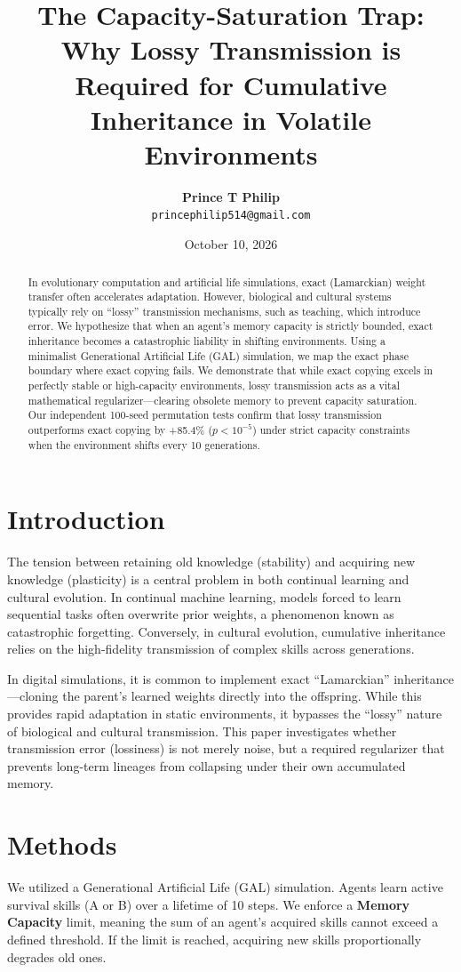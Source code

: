 \documentclass[11pt,a4paper]{article}
\title{\textbf{The Capacity-Saturation Trap: Why Lossy Transmission is Required for Cumulative Inheritance in Volatile Environments}}
\author{\textbf{Prince T Philip} \\ \texttt{princephilip514@gmail.com}}
\date{October 10, 2026}
\begin{document}
\maketitle

\begin{abstract}
In evolutionary computation and artificial life simulations, exact (Lamarckian) weight transfer often accelerates adaptation. However, biological and cultural systems typically rely on ``lossy'' transmission mechanisms, such as teaching, which introduce error. We hypothesize that when an agent's memory capacity is strictly bounded, exact inheritance becomes a catastrophic liability in shifting environments. Using a minimalist Generational Artificial Life (GAL) simulation, we map the exact phase boundary where exact copying fails. We demonstrate that while exact copying excels in perfectly stable or high-capacity environments, lossy transmission acts as a vital mathematical regularizer---clearing obsolete memory to prevent capacity saturation. Our independent 100-seed permutation tests confirm that lossy transmission outperforms exact copying by +85.4\% ($p < 10^{-5}$) under strict capacity constraints when the environment shifts every 10 generations.
\end{abstract}

\section{Introduction}
The tension between retaining old knowledge (stability) and acquiring new knowledge (plasticity) is a central problem in both continual learning and cultural evolution. In continual machine learning, models forced to learn sequential tasks often overwrite prior weights, a phenomenon known as catastrophic forgetting. Conversely, in cultural evolution, cumulative inheritance relies on the high-fidelity transmission of complex skills across generations.

In digital simulations, it is common to implement exact ``Lamarckian'' inheritance---cloning the parent's learned weights directly into the offspring. While this provides rapid adaptation in static environments, it bypasses the ``lossy'' nature of biological and cultural transmission. This paper investigates whether transmission error (lossiness) is not merely noise, but a required regularizer that prevents long-term lineages from collapsing under their own accumulated memory.

\section{Methods}
We utilized a Generational Artificial Life (GAL) simulation. Agents learn active survival skills (A or B) over a lifetime of 10 steps. We enforce a \textbf{Memory Capacity} limit, meaning the sum of an agent's acquired skills cannot exceed a defined threshold. If the limit is reached, acquiring new skills proportionally degrades old ones.
\end{document}
